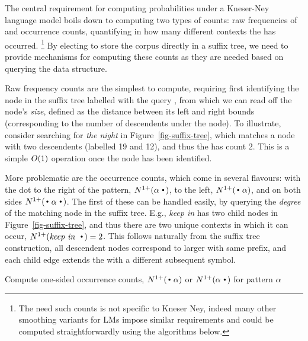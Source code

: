 
The central requirement for computing probabilities under a Kneser-Ney
language model boils down to computing two types of counts: raw
frequencies of \ngrams and occurrence counts, quantifying in how many different contexts the \ngram has occurred.%
\footnote{The need such counts is not specific to Kneser Ney, indeed
  many other smoothing variants for \ngram LMs impose similar
  requirements and could be computed straightforwardly using the algorithms below.}
By electing to store the corpus directly in a suffix tree, we need to
provide mechanisms for computing these counts as they are needed based
on querying the data structure.

Raw frequency counts are the simplest to compute, requiring first
identifying the node in the suffix tree labelled with the query
\ngram, from which we can read off the node's \emph{size}, defined as the
distance between its left and right bounds (corresponding to the
number of descendents under the node). To illustrate, consider
searching for \emph{the night} in  Figure~\ref{fig-suffix-tree}, which
matches a node with two descendents (labelled 19 and 12), and thus the
\ngram has count 2. This is a simple $O(1)$ operation once the
node has been identified.

More problematic are the occurrence counts, which come in several
flavours: with the dot to the right of the pattern, $\nlplus{\patdot}$,
to the left,  $\nlplus{\dotpat}$, and on both sides
$\nlplus{\dotpatdot}$. The first of these can be handled easily, by
querying the \emph{degree} of the matching node in the suffix tree. E.g., 
\emph{keep in} has two child nodes in  Figure~\ref{fig-suffix-tree},  
and thus there are two unique contexts in
which it can occur, $\nlplus{\emph{keep in~}\Bigcdot}=2$. This follows naturally from the suffix tree
construction, all descendent nodes correspond to larger \ngrams with
same prefix, and each child edge extends the \ngram with a different
subsequent symbol. 

\begin{algorithm}[th]
  \caption{Compute one-sided occurrence counts, $\nlplus{\dotpat}$ or $\nlplus{\patdot}$ for pattern $\alpha$ 
    \label{alg:n1plus}}
  \begin{algorithmic}[1]
        \Else
        \EndIf
      \State {}
    \EndFunction
  \end{algorithmic}
\label{alg-nlplus}
\end{algorithm}

